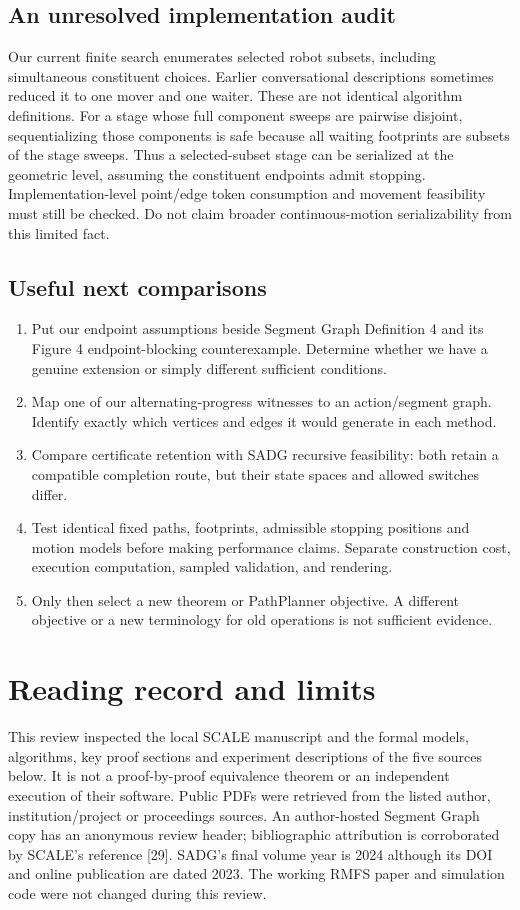 \documentclass[11pt,a4paper]{article}
\begin{document}
\subsection{An unresolved implementation audit}
Our current finite search enumerates selected robot subsets, including simultaneous
constituent choices. Earlier conversational descriptions sometimes reduced it to
one mover and one waiter. These are not identical algorithm definitions.
For a stage whose full component sweeps are pairwise disjoint, sequentializing
those components is safe because all waiting footprints are subsets of the
stage sweeps. Thus a selected-subset stage can be serialized at the geometric
level, assuming the constituent endpoints admit stopping. Implementation-level
point/edge token consumption and movement feasibility must still be checked.
Do not claim broader continuous-motion serializability from this limited fact.

\subsection{Useful next comparisons}
\begin{enumerate}
\item Put our endpoint assumptions beside Segment Graph Definition 4 and its
Figure 4 endpoint-blocking counterexample. Determine whether we have a genuine
extension or simply different sufficient conditions.
\item Map one of our alternating-progress witnesses to an action/segment graph.
Identify exactly which vertices and edges it would generate in each method.
\item Compare certificate retention with SADG recursive feasibility: both retain
a compatible completion route, but their state spaces and allowed switches differ.
\item Test identical fixed paths, footprints, admissible stopping positions and
motion models before making performance claims. Separate construction cost,
execution computation, sampled validation, and rendering.
\item Only then select a new theorem or PathPlanner objective. A different
objective or a new terminology for old operations is not sufficient evidence.
\end{enumerate}

\section{Reading record and limits}
This review inspected the local SCALE manuscript and the formal models,
algorithms, key proof sections and experiment descriptions of the five sources
below. It is not a proof-by-proof equivalence theorem or an independent execution
of their software. Public PDFs were retrieved from the listed author,
institution/project or proceedings sources. An author-hosted Segment Graph copy
has an anonymous review header; bibliographic attribution is corroborated by
SCALE's reference [29]. SADG's final volume year is 2024 although its DOI and
online publication are dated 2023. The working RMFS paper and simulation code
were not changed during this review.
\end{document}
